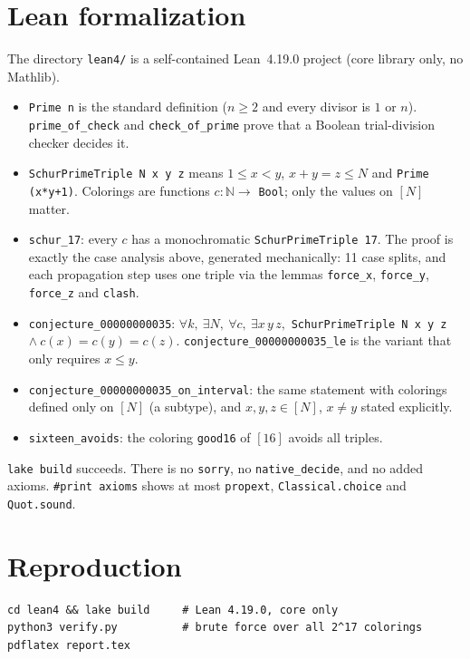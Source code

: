 \documentclass[11pt]{article}
\theoremstyle{remark}
\begin{document}
\section{Lean formalization}
The directory \texttt{lean4/} is a self-contained Lean~4.19.0 project (core
library only, no Mathlib).
\begin{itemize}
\item \texttt{Prime n} is the standard definition ($n\ge2$ and every divisor is
$1$ or $n$). \texttt{prime\_of\_check} and \texttt{check\_of\_prime} prove that a
Boolean trial-division checker decides it.
\item \texttt{SchurPrimeTriple N x y z} means $1\le x<y$, $x+y=z\le N$ and
\texttt{Prime (x*y+1)}. Colorings are functions $c:\mathbb N\to$ \texttt{Bool};
only the values on $[N]$ matter.
\item \texttt{schur\_17}: every $c$ has a monochromatic
\texttt{SchurPrimeTriple 17}. The proof is exactly the case analysis above,
generated mechanically: 11 case splits, and each propagation step uses one
triple via the lemmas \texttt{force\_x}, \texttt{force\_y}, \texttt{force\_z}
and \texttt{clash}.
\item \texttt{conjecture\_00000000035}:
$\forall k,\ \exists N,\ \forall c,\ \exists x\,y\,z,$ \texttt{SchurPrimeTriple N x y z}
$\wedge\ c(x)=c(y)=c(z)$. \texttt{conjecture\_00000000035\_le} is the variant that
only requires $x\le y$.
\item \texttt{conjecture\_00000000035\_on\_interval}: the same statement with
colorings defined only on $[N]$ (a subtype), and $x,y,z\in[N]$, $x\ne y$ stated
explicitly.
\item \texttt{sixteen\_avoids}: the coloring \texttt{good16} of $[16]$ avoids all
triples.
\end{itemize}
\texttt{lake build} succeeds. There is no \texttt{sorry}, no
\texttt{native\_decide}, and no added axioms. \texttt{\#print axioms} shows at
most \texttt{propext}, \texttt{Classical.choice} and \texttt{Quot.sound}.

\section{Reproduction}
\begin{verbatim}
cd lean4 && lake build     # Lean 4.19.0, core only
python3 verify.py          # brute force over all 2^17 colorings
pdflatex report.tex
\end{verbatim}
\end{document}
